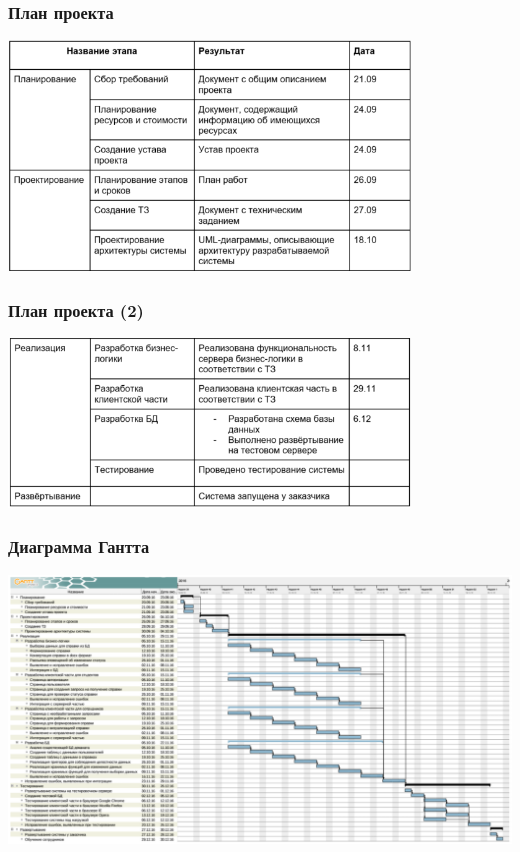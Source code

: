 \documentclass{../../slides-style}
\begin{document}
    \begin{frame}
        \frametitle{План проекта}
        \begin{center}
            \includegraphics[width=0.8\textwidth]{plan1.png}
        \end{center}
    \end{frame}

    \begin{frame}
        \frametitle{План проекта (2)}
        \begin{center}
            \includegraphics[width=0.8\textwidth]{plan2.png}
        \end{center}
    \end{frame}

    \begin{frame}
        \frametitle{Диаграмма Гантта}
        \begin{center}
            \includegraphics[width=\textwidth]{ganttChart.png}
        \end{center}
    \end{frame}
\end{document}
